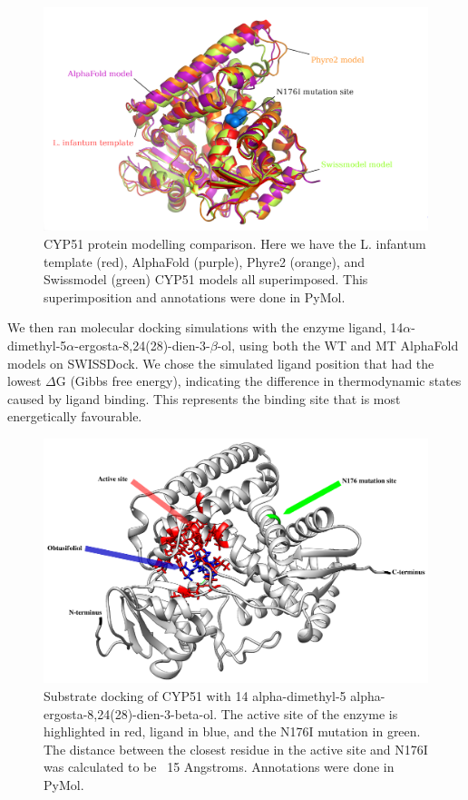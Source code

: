 \documentclass{bioinfo}
\begin{document}
\begin{figure}
\includegraphics[width=1\linewidth]{model comparison} \caption{CYP51 protein modelling comparison. Here we have the L. infantum template (red), AlphaFold (purple), Phyre2 (orange), and Swissmodel (green) CYP51 models all superimposed. This superimposition and annotations were done in PyMol.}\label{fig:figure5}
\end{figure}

We then ran molecular docking simulations with the enzyme ligand,
14\(\alpha\)-dimethyl-5\(\alpha\)-ergosta-8,24(28)-dien-3-\(\beta\)-ol,
using both the WT and MT AlphaFold models on SWISSDock. We chose the
simulated ligand position that had the lowest \(\Delta\)G (Gibbs free
energy), indicating the difference in thermodynamic states caused by
ligand binding. This represents the binding site that is most
energetically favourable.\\

\begin{figure}
\includegraphics[width=1\linewidth]{CYP51 substrate interaction} \caption{Substrate docking of CYP51 with 14 alpha-dimethyl-5 alpha-ergosta-8,24(28)-dien-3-beta-ol. The active site of the enzyme is highlighted in red, ligand in blue, and the N176I mutation in green. The distance between the closest residue in the active site and N176I was calculated to be ~15 Angstroms. Annotations were done in PyMol.}\label{fig:figure6}
\end{figure}
\end{document}
